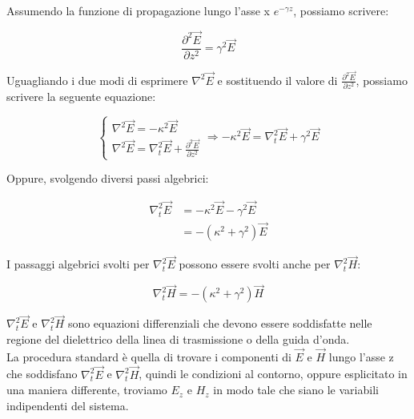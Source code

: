 Assumendo la funzione di propagazione lungo l'asse x $e^{-\gamma z}$, possiamo scrivere: 

{
    \Large
    \begin{equation} 
        \frac{\partial ^{2} \vec{E}}{\partial z^{2}} = \gamma ^{2} \vec{E}
    \end{equation}
}

Uguagliando i due modi di esprimere $\nabla ^{2} \vec{E}$ e sostituendo il 
valore di $ \frac{\partial ^{2} \vec{E}}{\partial z^{2}}$, possiamo scrivere la seguente equazione: 

{
    \Large 
    \begin{equation}
        \begin{cases}
            \nabla ^{2} \vec{E} = - \kappa ^{2}  \vec{E} \\
            \nabla ^{2} \vec{E} = \nabla_t ^{2} \vec{E} + \frac{\partial ^{2} \vec{E}}{\partial z^{2}}
        \end{cases} 
        \Rightarrow
        - \kappa ^{2}  \vec{E} = \nabla_t ^{2} \vec{E} + \gamma ^{2} \vec{E}
    \end{equation}
}

Oppure, svolgendo diversi passi algebrici: 

{
    \Large
    \begin{equation}
        \begin{split}
            \nabla_t ^{2} \vec{E} 
            &= - \kappa ^{2}  \vec{E} - \gamma ^{2}  \vec{E} \\ 
            &= -(\kappa ^{2} + \gamma ^{2}) \vec{E} 
        \end{split}
    \end{equation}
}

I passaggi algebrici svolti per $\nabla_t ^{2} \vec{E}$ possono essere svolti 
anche per $\nabla_t ^{2} \vec{H}$: 

{
    \Large
    \begin{equation}
        \nabla_t ^{2} \vec{H} = -(\kappa ^{2} + \gamma ^{2}) \vec{H}
    \end{equation}
}

$\nabla_t ^{2} \vec{E}$ e $\nabla_t ^{2} \vec{H}$ sono equazioni differenziali che devono essere soddisfatte 
nelle regione del dielettrico della linea di trasmissione o della guida d'onda. \\ 


La procedura standard è quella di trovare i componenti di $\vec{E}$ e $\vec{H}$ lungo 
l'asse z che soddisfano $\nabla_t ^{2} \vec{E}$ e $\nabla_t ^{2} \vec{H}$, quindi le condizioni al contorno, oppure 
esplicitato in una maniera differente, troviamo $E_z$ e $H_z$ in modo tale che siano le variabili indipendenti del sistema. \\ 

